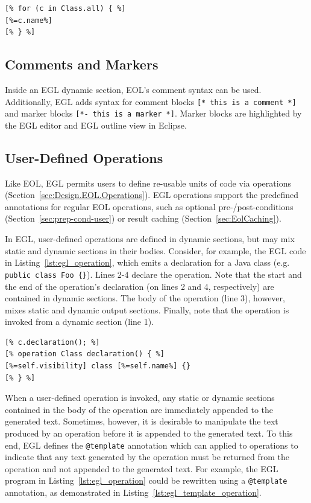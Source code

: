 \begin{lstlisting}[float=tbp, caption=Generating the name of each Class contained in an input model., label=lst:oo, language=EGL]
[% for (c in Class.all) { %]
[%=c.name%]
[% } %]
\end{lstlisting}

\subsection{Comments and Markers}
Inside an EGL dynamic section, EOL's comment syntax can be used. Additionally, EGL adds syntax for comment blocks \texttt{[* this is a comment *]} and marker blocks \texttt{[*- this is a marker *]}. Marker blocks are highlighted by the EGL editor and EGL outline view in Eclipse.

\subsection{User-Defined Operations}

Like EOL, EGL permits users to define re-usable units of code via operations (Section~\ref{sec:Design.EOL.Operations}). EGL operations support the predefined annotations for regular EOL operations, such as optional pre-/post-conditions (Section~\ref{sec:prep-cond-user}) or
result caching (Section~\ref{sec:EolCaching}).

In EGL, user-defined operations are defined in dynamic sections, but may mix static and dynamic sections in their bodies. Consider, for example, the EGL code in Listing~\ref{lst:egl_operation}, which emits a declaration for a Java class (e.g. \texttt{public class Foo \{\}}). Lines 2-4 declare the operation. Note that the start and the end of the operation's declaration (on lines 2 and 4, respectively) are contained in dynamic sections. The body of the operation (line 3), however, mixes static and dynamic output sections. Finally, note that the operation is invoked from a dynamic section (line 1).

\begin{lstlisting}[float=tbp, caption=Using an operation to specify the text generated for a declaration of a Java class., label=lst:egl_operation, language=EGL]
[% c.declaration(); %]
[% operation Class declaration() { %]
[%=self.visibility] class [%=self.name%] {}
[% } %]
\end{lstlisting}

When a user-defined operation is invoked, any static or dynamic sections contained in the body of the operation are immediately appended to the generated text. Sometimes, however, it is desirable to manipulate the text produced by an operation before it is appended to the generated text. To this end, EGL defines the \texttt{@template} annotation which can applied to operations to indicate that any text generated by the operation must be returned from the operation and not appended to the generated text. For example, the EGL program in Listing~\ref{lst:egl_operation} could be rewritten using a \texttt{@template} annotation, as demonstrated in Listing~\ref{lst:egl_template_operation}.

